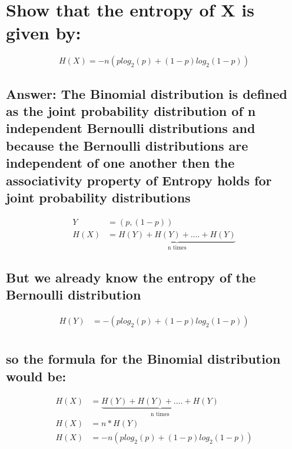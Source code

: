\documentclass[15px]{article}
\begin{document}
\section*{Show that the entropy of X is given by:} 
\begin{equation}
H(X)=-n(plog_2(p) + (1-p)log_2(1-p))    
\end{equation}

\subsection*{Answer: The Binomial distribution is defined as the joint probability distribution of n independent Bernoulli distributions and because the Bernoulli distributions are independent of one another then the associativity property of Entropy holds for joint probability distributions}

\begin{equation}
\begin{split}
Y & = (p,(1-p))  \\
H(X) & = \underbrace{H(Y) + H(Y) + .... + H(Y)}_\text{n times}
\end{split}
\end{equation}

\subsection*{But we already know the entropy of the Bernoulli distribution}

\begin{equation}
\begin{split}
H(Y) & =  -(plog_2(p) + (1-p)log_2(1-p))  \\
\end{split}
\end{equation}

\subsection*{so the formula for the Binomial distribution would be:}

\begin{equation}
\begin{split}
H(X) & = \underbrace{H(Y) + H(Y) + .... + H(Y)}_\text{n times} \\
H(X) & = n*H(Y) \\
H(X) & = -n(plog_2(p) + (1-p)log_2(1-p))
\end{split}
\end{equation}
\end{document}
